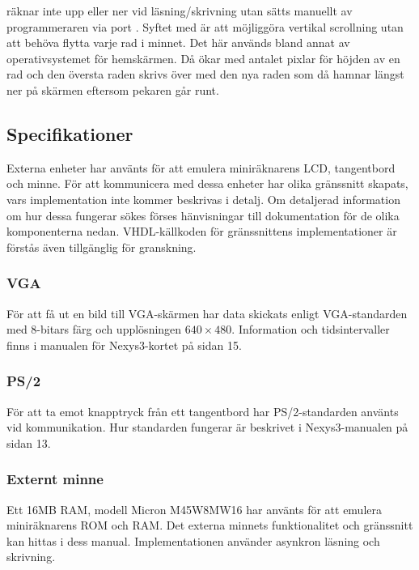 \documentclass[main.tex]{subfiles}
\begin{document}
 räknar inte upp eller ner vid läsning/skrivning utan sätts manuellt av
programmeraren via port . Syftet med  är att möjliggöra
vertikal scrollning utan att behöva flytta varje rad i minnet. Det här används
bland annat av operativsystemet för hemskärmen. Då ökar  med antalet
pixlar för höjden av en rad och den översta raden skrivs över med den nya raden
som då hamnar längst ner på skärmen eftersom pekaren går runt.

\subsection{Specifikationer}
Externa enheter har använts för att emulera miniräknarens LCD, tangentbord och
minne. För att kommunicera med dessa enheter har olika gränssnitt skapats, vars
implementation inte kommer beskrivas i detalj. Om detaljerad information om hur
dessa fungerar sökes förses hänvisningar till dokumentation för de olika
komponenterna nedan. VHDL-källkoden för gränssnittens implementationer är
förstås även tillgänglig för granskning.

\subsubsection*{VGA}
För att få ut en bild till VGA-skärmen har data skickats enligt VGA-standarden
med 8-bitars färg och upplösningen $640\times480$. Information och
tidsintervaller finns i manualen för Nexys3-kortet på sidan 15.\cite{nexys3}
\subsubsection*{PS/2}
För att ta emot knapptryck från ett tangentbord har PS/2-standarden använts vid
kommunikation. Hur standarden fungerar är beskrivet i Nexys3-manualen på sidan
13.\cite{nexys3}
\subsubsection*{Externt minne}
Ett 16MB RAM, modell Micron M45W8MW16 har använts för att emulera miniräknarens
ROM och RAM. Det externa minnets funktionalitet och gränssnitt kan hittas i
dess manual.\cite{m45} Implementationen använder asynkron läsning och
skrivning.

\clearpage
\end{document}
